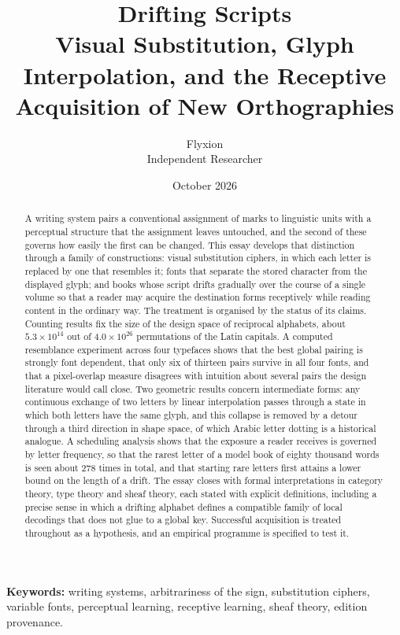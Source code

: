 \documentclass[11pt]{article}
\title{\textbf{Drifting Scripts}\\[0.35em]
\large Visual Substitution, Glyph Interpolation, and the Receptive Acquisition of New Orthographies}
\author{Flyxion\\ \small Independent Researcher}
\date{October 2026}
\theoremstyle{remark}
\begin{document}
\maketitle

\begin{abstract}
\noindent
A writing system pairs a conventional assignment of marks to linguistic units with a perceptual structure that the assignment leaves untouched, and the second of these governs how easily the first can be changed. This essay develops that distinction through a family of constructions: visual substitution ciphers, in which each letter is replaced by one that resembles it; fonts that separate the stored character from the displayed glyph; and books whose script drifts gradually over the course of a single volume so that a reader may acquire the destination forms receptively while reading content in the ordinary way. The treatment is organised by the status of its claims. Counting results fix the size of the design space of reciprocal alphabets, about $5.3\times10^{14}$ out of $4.0\times10^{26}$ permutations of the Latin capitals. A computed resemblance experiment across four typefaces shows that the best global pairing is strongly font dependent, that only six of thirteen pairs survive in all four fonts, and that a pixel-overlap measure disagrees with intuition about several pairs the design literature would call close. Two geometric results concern intermediate forms: any continuous exchange of two letters by linear interpolation passes through a state in which both letters have the same glyph, and this collapse is removed by a detour through a third direction in shape space, of which Arabic letter dotting is a historical analogue. A scheduling analysis shows that the exposure a reader receives is governed by letter frequency, so that the rarest letter of a model book of eighty thousand words is seen about 278 times in total, and that starting rare letters first attains a lower bound on the length of a drift. The essay closes with formal interpretations in category theory, type theory and sheaf theory, each stated with explicit definitions, including a precise sense in which a drifting alphabet defines a compatible family of local decodings that does not glue to a global key. Successful acquisition is treated throughout as a hypothesis, and an empirical programme is specified to test it.
\end{abstract}

\vspace{0.4em}
\noindent\textbf{Keywords:} writing systems, arbitrariness of the sign, substitution ciphers, variable fonts, perceptual learning, receptive learning, sheaf theory, edition provenance.

\tableofcontents
\newpage













\appendix



\end{document}
